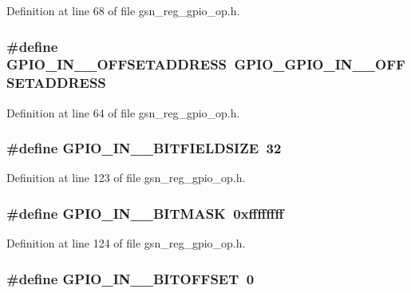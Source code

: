 Definition at line 68 of file gsn\_\-reg\_\-gpio\_\-op.h.

\hypertarget{a00553_a4f8fa50ef8d0c72718d5cf595edb3299}{
\subsubsection[{GPIO\_\-IN\_\-0\_\-OFFSETADDRESS}]{\setlength{\rightskip}{0pt plus 5cm}\#define GPIO\_\-IN\_\_\-OFFSETADDRESS~GPIO\_\-GPIO\_\-IN\_\_\-OFFSETADDRESS}}
\label{a00553_a4f8fa50ef8d0c72718d5cf595edb3299}


Definition at line 64 of file gsn\_\-reg\_\-gpio\_\-op.h.

\hypertarget{a00553_a3ec09a20201a35c8d628c12e5bf1fc42}{
\subsubsection[{GPIO\_\-IN\_\-1\_\-BITFIELDSIZE}]{\setlength{\rightskip}{0pt plus 5cm}\#define GPIO\_\-IN\_\_\-BITFIELDSIZE~32}}
\label{a00553_a3ec09a20201a35c8d628c12e5bf1fc42}


Definition at line 123 of file gsn\_\-reg\_\-gpio\_\-op.h.

\hypertarget{a00553_aebe6ca53d62f11ec2e44bed4ad0281a5}{
\subsubsection[{GPIO\_\-IN\_\-1\_\-BITMASK}]{\setlength{\rightskip}{0pt plus 5cm}\#define GPIO\_\-IN\_\_\-BITMASK~0xffffffff}}
\label{a00553_aebe6ca53d62f11ec2e44bed4ad0281a5}


Definition at line 124 of file gsn\_\-reg\_\-gpio\_\-op.h.

\hypertarget{a00553_af7f4253fcc9ade6e874ec469cf6d9726}{
\subsubsection[{GPIO\_\-IN\_\-1\_\-BITOFFSET}]{\setlength{\rightskip}{0pt plus 5cm}\#define GPIO\_\-IN\_\_\-BITOFFSET~0}}
\label{a00553_af7f4253fcc9ade6e874ec469cf6d9726}


